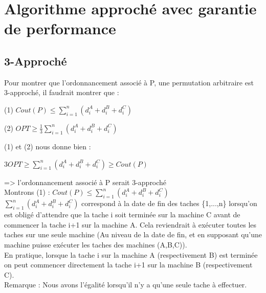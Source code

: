 \documentclass[12pt]{article}
\begin{document}
\section{Algorithme approché avec garantie de performance}



\subsection{3-Approché}

Pour montrer que l'ordonnancement associé à P, une permutation arbitraire est 3-approché, il faudrait montrer que : \\
\begin{center}
(1) $Cout(P) \le \displaystyle\sum_{i=1}^n(d_i^A+d_i^B+d_i^C)$\\
\end{center}
\begin{center}
(2) $OPT \ge \frac{1}{3}\displaystyle\sum_{i=1}^n(d_i^A+d_i^B+d_i^C)$\\
\end{center}
(1) et (2) nous donne bien :\\
\begin{center}
$3OPT \ge \displaystyle\sum_{i=1}^n(d_i^A+d_i^B+d_i^C) \ge Cout(P)$\\
\end{center}
=> l'ordonnancement associé à P serait 3-approché\\

Montrons (1) : $Cout(P) \le \displaystyle\sum_{i=1}^n(d_i^A+d_i^B+d_i^C)$\\

$\displaystyle\sum_{i=1}^n(d_i^A+d_i^B+d_i^C)$ correspond à la date de fin des taches \{1,...,n\} lorsqu'on est obligé d'attendre que la tache i soit terminée sur la machine C avant de commencer la tache i+1 sur la machine A. Cela reviendrait à exécuter toutes les taches sur une seule machine (Au niveau de la date de fin, et en supposant qu'une machine puisse exécuter les taches des machines (A,B,C)). \\

En pratique, lorsque la tache i sur la machine A (respectivement B) est terminée on peut commencer directement la tache i+1 sur la machine B (respectivement C).\\

Remarque : Nous avons l'égalité lorsqu'il n'y a qu'une seule tache à effectuer.\\
\end{document}
